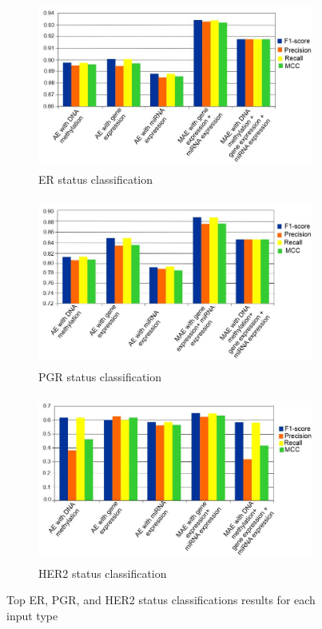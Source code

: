 \begin{figure}[h]
	\centering
	\begin{subfigure}{.49\linewidth}
		\centering
		\includegraphics[width=\linewidth,height=55mm]{images/1.png}
		\caption{ER status classification}
        \label{fig:top_er}
	\end{subfigure}
	\begin{subfigure}{.49\linewidth}
		\centering
		\includegraphics[width=\linewidth,height=55mm]{images/2.png}
		\caption{PGR status classification}
        \label{fig:top_pgr}
	\end{subfigure}
	\begin{subfigure}{0.49\linewidth}
		\centering
		\includegraphics[width=\linewidth,height=55mm]{images/3.png}
		\caption{HER2 status classification }
        \label{fig:top_her2}
	\end{subfigure}
	\caption{Top ER, PGR, and HER2 status classifications results for each input type~\cite{karimACCESS2019}} 
	\label{fig6}
		\vspace{-2mm} 
\end{figure}

